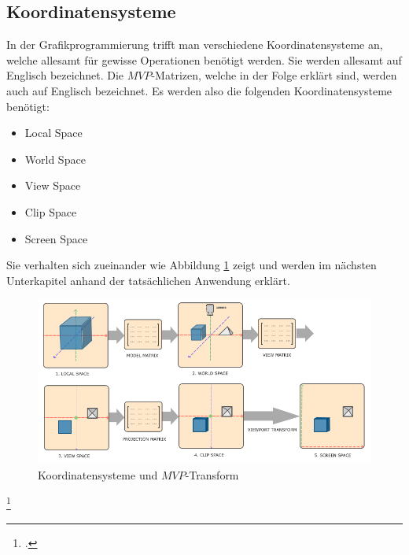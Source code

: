 \documentclass[titlepage, 11pt, a4paper, ngerman]{article}
\begin{document}
\subsection{Koordinatensysteme}
In der Grafikprogrammierung trifft man verschiedene Koordinatensysteme an, welche allesamt für gewisse Operationen benötigt werden. Sie werden allesamt auf Englisch bezeichnet. Die $MVP$-Matrizen, welche in der Folge erklärt sind, werden auch auf Englisch bezeichnet. Es werden also die folgenden Koordinatensysteme benötigt:
\begin{itemize}
    \item Local Space
    \item World Space
    \item View Space
    \item Clip Space
    \item Screen Space
\end{itemize}
Sie verhalten sich zueinander wie Abbildung \ref{fig:coordinate-systems} zeigt und werden im nächsten Unterkapitel anhand der tatsächlichen Anwendung erklärt.
\begin{figure}[ht]
    \centering
    \includegraphics[scale=0.55]{res/coordinate_systems.png}
    \caption[Koordinatensysteme und $MVP$-Transform]{Koordinatensysteme und $MVP$-Transform\footnotemark}
    \label{fig:coordinate-systems}
\end{figure}
\footcitetext{coordinate-systems}
\end{document}

